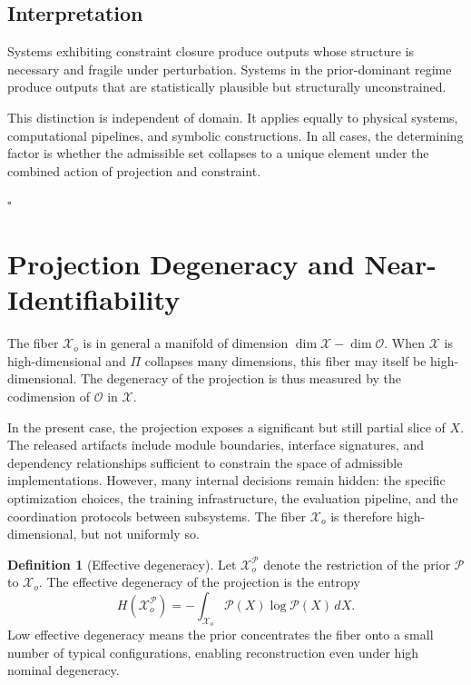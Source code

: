 \documentclass[12pt, oneside]{article}
\theoremstyle{plain}
\theoremstyle{definition}
\newtheorem{definition}[theorem]{Definition}
\theoremstyle{remark}
\newcommand{\proj}{\Pi}
\newcommand{\config}{\mathcal{X}}
\newcommand{\obs}{\mathcal{O}}
\newcommand{\prior}{\mathcal{P}}
\begin{document}
\subsection{Interpretation}

Systems exhibiting constraint closure produce outputs whose structure is necessary and fragile under perturbation. Systems in the prior-dominant regime produce outputs that are statistically plausible but structurally unconstrained.

This distinction is independent of domain. It applies equally to physical systems, computational pipelines, and symbolic constructions. In all cases, the determining factor is whether the admissible set collapses to a unique element under the combined action of projection and constraint.

\hfill $\square$

\section{Projection Degeneracy and Near-Identifiability}

The fiber $\config_o$ is in general a manifold of dimension $\dim \config - \dim \obs$.
When $\config$ is high-dimensional and $\proj$ collapses many dimensions, this fiber may
itself be high-dimensional. The degeneracy of the projection is thus measured by the
codimension of $\obs$ in $\config$.

In the present case, the projection exposes a significant but still partial slice of $X$.
The released artifacts include module boundaries, interface signatures, and dependency
relationships sufficient to constrain the space of admissible implementations. However, many
internal decisions remain hidden: the specific optimization choices, the training
infrastructure, the evaluation pipeline, and the coordination protocols between subsystems.
The fiber $\config_o$ is therefore high-dimensional, but not uniformly so.

\begin{definition}[Effective degeneracy]
Let $\config_o^{\prior}$ denote the restriction of the prior $\prior$ to $\config_o$.
The effective degeneracy of the projection is the entropy
\[
  H(\config_o^{\prior}) = -\int_{\config_o} \prior(X) \log \prior(X) \, dX.
\]
Low effective degeneracy means the prior concentrates the fiber onto a small number of
typical configurations, enabling reconstruction even under high nominal degeneracy.
\end{definition}
\end{document}
